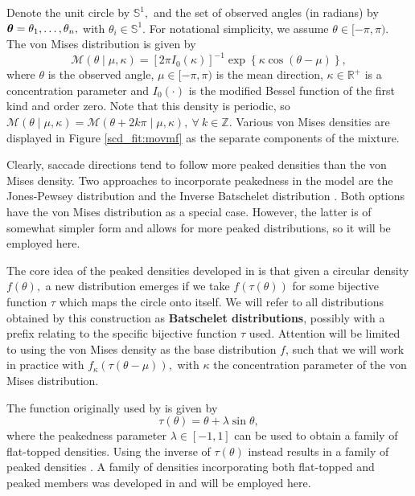 Denote the unit circle by \(\mathbb{S}^1,\) and the set of observed angles (in radians) by \(\boldsymbol{\theta} = \theta_1, \dots, \theta_n,\) with \(\theta_i \in \mathbb{S}^1.\) For notational simplicity, we assume \(\theta \in [-\pi, \pi).\) The von Mises distribution is given by
\begin{equation}
\mathcal{M} (\theta \mid \mu, \kappa) = \left[ 2 \pi I_0 (\kappa) \right]^{-1} \exp \left\{ \kappa \cos (\theta - \mu) \right\},
\end{equation}
where \( \theta \) is the observed angle, \( \mu \in [-\pi, \pi)\) is the mean direction, \( \kappa \in \mathbb{R}^+ \) is a concentration parameter and \( I_0(\cdot) \) is the modified Bessel function of the first kind and order zero. Note that this density is periodic, so \( \mathcal{M} (\theta \mid \mu, \kappa) = \mathcal{M} (\theta + 2 k \pi \mid \mu, \kappa), ~ \forall ~ k \in \mathbb{Z}.\) Various von Mises densities are displayed in Figure \ref{scd_fit:movmf} as the separate components of the mixture.

Clearly, saccade directions tend to follow more peaked densities than the von Mises density. Two approaches to incorporate peakedness in the model are the Jones-Pewsey distribution \citep{jones2005family} and the Inverse Batschelet distribution \citep{jones2012inverse}. Both options have the von Mises distribution as a special case. However, the latter is of somewhat simpler form and allows for more peaked distributions, so it will be employed here.

The core idea of the peaked densities developed in \citet{batschelet1981circular} is that given a circular density \(f (\theta), \) a new distribution emerges if we take \(f (\tau(\theta)) \) for some bijective function \( \tau \) which maps the circle onto itself. We will refer to all distributions obtained by this construction as \textbf{Batschelet distributions}, possibly with a prefix relating to the specific bijective function  \(\tau\) used. Attention will be limited to using the von Mises density as the base distribution \(f\), such that we will work in practice with \(f_\kappa (\tau(\theta - \mu)), \) with \( \kappa \) the concentration parameter of the von Mises distribution.

The function originally used by \citet{batschelet1981circular} is given by
\begin{equation}
  \tau(\theta) = \theta + \lambda \sin \theta,
\end{equation}
where the peakedness parameter \( \lambda \in [-1, 1] \) can be used to obtain a family of flat-topped densities. Using the inverse of \(\tau(\theta)\) instead results in a family of peaked densities \citep{abe2010symmetric, pewsey2011extension}. A family of densities incorporating both flat-topped and peaked members was developed in \citet{jones2012inverse} and will be employed here.

